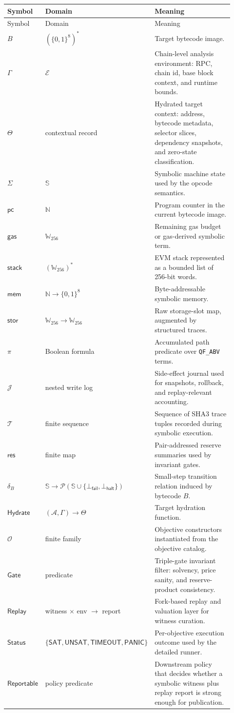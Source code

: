 \documentclass[11pt]{article}
\numberwithin{equation}{section}
\theoremstyle{remark}
\newcommand{\QFABV}{\texttt{QF\_ABV}}
\newcommand{\Pow}{\mathcal{P}}
\newcommand{\Bits}[1]{\{0,1\}^{#1}}
\newcommand{\Words}[1]{\mathbb{W}_{#1}}
\newcommand{\Naturals}{\mathbb{N}}
\newcommand{\Fail}{\bot_{\mathsf{fail}}}
\newcommand{\Halt}{\bot_{\mathsf{halt}}}
\newcommand{\StateSpace}{\mathbb{S}}
\newcommand{\Env}{\mathcal{E}}
\newcommand{\Ctx}{\Theta}
\newcommand{\Trace}{\mathcal{T}}
\newcommand{\Journal}{\mathcal{J}}
\newcommand{\Path}{\pi}
\newcommand{\Storage}{\mathsf{stor}}
\newcommand{\Memory}{\mathsf{mem}}
\newcommand{\Stack}{\mathsf{stack}}
\newcommand{\Gas}{\mathsf{gas}}
\newcommand{\PC}{\mathsf{pc}}
\newcommand{\Replay}{\mathsf{Replay}}
\newcommand{\Hydrate}{\mathsf{Hydrate}}
\newcommand{\Gate}{\mathsf{Gate}}
\newcommand{\Reportable}{\mathsf{Reportable}}
\newcommand{\sat}{\mathsf{SAT}}
\newcommand{\unsat}{\mathsf{UNSAT}}
\newcommand{\timeout}{\mathsf{TIMEOUT}}
\newcommand{\panicstatus}{\mathsf{PANIC}}
\newcommand{\Status}{\mathsf{Status}}
\newcommand{\Addr}{\mathcal{A}}
\newcommand{\Objectives}{\mathcal{O}}
\newcommand{\Reserves}{\mathsf{res}}
\begin{document}
\begin{longtable}{p{0.17\linewidth}p{0.25\linewidth}p{0.50\linewidth}}
\toprule
Symbol & Domain & Meaning \\
\midrule
\endfirsthead
\toprule
Symbol & Domain & Meaning \\
\midrule
\endhead
\bottomrule
\endfoot
\(B\) & \((\Bits{8})^\ast\) & Target bytecode image. \\
\(\Gamma\) & \(\Env\) & Chain-level analysis environment: RPC, chain id, base block context, and runtime bounds. \\
\(\Ctx\) & contextual record & Hydrated target context: address, bytecode metadata, selector slices, dependency snapshots, and zero-state classification. \\
\(\Sigma\) & \(\StateSpace\) & Symbolic machine state used by the opcode semantics. \\
\(\PC\) & \(\Naturals\) & Program counter in the current bytecode image. \\
\(\Gas\) & \(\Words{256}\) & Remaining gas budget or gas-derived symbolic term. \\
\(\Stack\) & \((\Words{256})^\ast\) & EVM stack represented as a bounded list of 256-bit words. \\
\(\Memory\) & \(\Naturals \to \Bits{8}\) & Byte-addressable symbolic memory. \\
\(\Storage\) & \(\Words{256} \to \Words{256}\) & Raw storage-slot map, augmented by structured traces. \\
\(\Path\) & Boolean formula & Accumulated path predicate over \QFABV{} terms. \\
\(\Journal\) & nested write log & Side-effect journal used for snapshots, rollback, and replay-relevant accounting. \\
\(\Trace\) & finite sequence & Sequence of SHA3 trace tuples recorded during symbolic execution. \\
\(\Reserves\) & finite map & Pair-addressed reserve summaries used by invariant gates. \\
\(\delta_B\) & \(\StateSpace \to \Pow(\StateSpace \cup \{\Fail,\Halt\})\) & Small-step transition relation induced by bytecode \(B\). \\
\(\Hydrate\) & \((\Addr,\Gamma) \to \Ctx\) & Target hydration function. \\
\(\Objectives\) & finite family & Objective constructors instantiated from the objective catalog. \\
\(\Gate\) & predicate & Triple-gate invariant filter: solvency, price sanity, and reserve-product consistency. \\
\(\Replay\) & witness \(\times\) env \(\to\) report & Fork-based replay and valuation layer for witness curation. \\
\(\Status\) & \(\{\sat,\unsat,\timeout,\panicstatus\}\) & Per-objective execution outcome used by the detailed runner. \\
\(\Reportable\) & policy predicate & Downstream policy that decides whether a symbolic witness plus replay report is strong enough for publication. \\
\bottomrule
\end{longtable}
\end{document}
